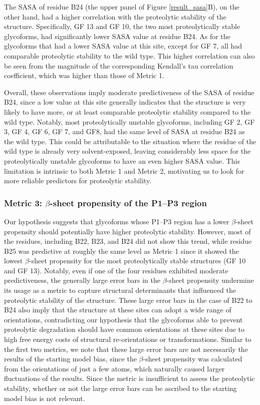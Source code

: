 \documentclass[sn-vancouver]{sn-jnl}
\begin{document}
The SASA of residue B24 (the upper panel of Figure \ref{result_sasa}B), on the other hand, had a higher correlation with the proteolytic stability of the structure. Specifically, GF 13 and GF 10, the two most proteolytically stable glycoforms, had significantly lower SASA value at residue B24. As for the glycoforms that had a lower SASA value at this site, except for GF 7, all had comparable proteolytic stability to the wild type. This higher correlation can also be seen from the magnitude of the corresponding Kendall's tau correlation coefficient, which was higher than those of Metric 1.

Overall, these observations imply moderate predictiveness of the SASA of residue B24, since a low value at this site generally indicates that the structure is very likely to have more, or at least comparable proteolytic stability compared to the wild type. Notably, most proteolytically unstable glycoforms, including GF 2, GF 3, GF 4, GF 6, GF 7, and GF8, had the same level of SASA at residue B24 as the wild type. This could be attributable to the situation where the residue of the wild type is already very solvent-exposed, leaving considerably less space for the proteolytically unstable glycoforms to have an even higher SASA value. This limitation is intrinsic to both Metric 1 and Metric 2, motivating us to look for more reliable predictors for proteolytic stability. 

\subsubsection*{Metric 3: \texorpdfstring{$\beta$}{Lg}-sheet propensity of the P1--P3 region}
Our hypothesis suggests that glycoforms whose P1--P3 region has a lower $\beta$-sheet propensity should potentially have higher proteolytic stability. However, most of the residues, including B22, B23, and B24 did not show this trend, while residue B25 was predictive at roughly the same level as Metric 1 since it showed the lowest $\beta$-sheet propensity for the most proteolytically stable structures (GF 10 and GF 13). Notably, even if one of the four residues exhibited moderate predictiveness, the generally large error bars in the $\beta$-sheet propensity undermine its usage as a metric to capture structural determinants that influenced the proteolytic stability of the structure. These large error bars in the case of B22 to B24 also imply that the structure at these sites can adopt a wide range of orientations, contradicting our hypothesis that the glycoforms able to prevent proteolytic degradation should have common orientations at these sites due to high free energy costs of structural re-orientations or transformations. Similar to the first two metrics, we note that these large error bars are not necessarily the results of the starting model bias, since the $\beta$-sheet propensity was calculated from the orientations of just a few atoms, which naturally caused larger fluctuations of the results. Since the metric is insufficient to assess the proteolytic stability, whether or not the large error bars can be ascribed to the starting model bias is not relevant. 
\end{document}
